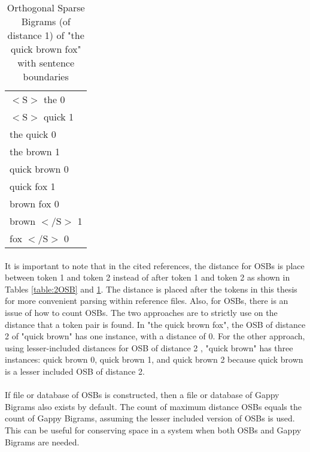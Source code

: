 		\begin{center}
			\begin{table}[h]
			\caption{Orthogonal Sparse Bigrams (of distance 1) of "the quick brown fox" with sentence boundaries}
			\label{table:1OSB}
				\begin{center}
					\begin{tabular}{l}
					$<\text{S}>$ the 0\\
					$<\text{S}>$ quick 1\\
					the quick 0\\
					the brown 1\\
					quick brown 0\\
					quick fox 1\\
					brown fox 0\\
					brown $<\text{/S}>$ 1\\
					fox $<\text{/S}>$ 0\\
					\end{tabular}
				\end{center}
			\end{table}
		\end{center}
		
		\paragraph{}It is important to note that in the cited references, the distance for OSBs is place between token 1 and token 2 instead of after token 1 and token 2 as shown in Tables \ref{table:2OSB} and \ref{table:1OSB}.  The distance is placed after the tokens in this thesis for more convenient parsing within reference files.  Also, for OSBs, there is an issue of how to count OSBs.  The two approaches are to strictly use on the distance that a token pair is found.  In "the quick brown fox", the OSB of distance 2 of "quick brown" has one instance, with a distance of 0.  For the other approach, using lesser-included distances for OSB of distance 2 , "quick brown" has three instances: quick brown 0, quick brown 1, and quick brown 2 because quick brown is a lesser included OSB of distance 2.  
		\paragraph{} If file or database of OSBs is constructed, then a file or database of Gappy Bigrams also exists by default.  The count of maximum distance OSBs equals the count of Gappy Bigrams, assuming the lesser included version of OSBs is used.  This can be useful for conserving space in a system when both OSBs and Gappy Bigrams are needed.

